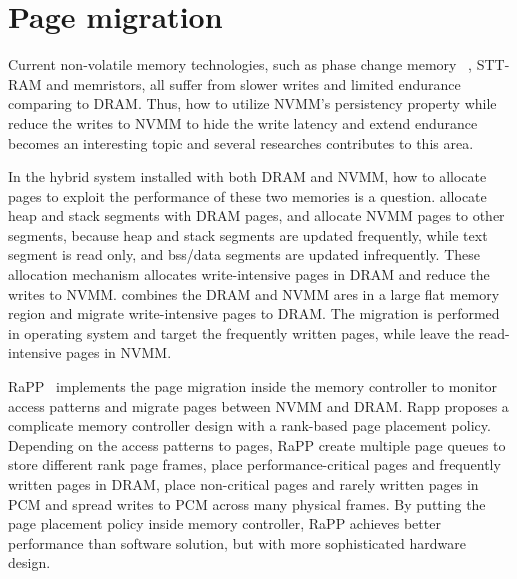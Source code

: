 \section{Page migration} 
\label{sec:migration}

Current non-volatile memory technologies, such as phase change memory
~\cite{PCMHierarchy}, STT-RAM and memristors, all suffer from slower writes and
limited endurance comparing to DRAM.
Thus, how to utilize NVMM's persistency property while reduce the writes to
NVMM to hide the write latency and extend endurance becomes an interesting
topic and several researches contributes to this area.

In the hybrid system installed with both DRAM and NVMM, how to allocate
pages to exploit the performance of these two memories is a question.
\cite{pcmalloc} allocate heap and stack segments with DRAM pages, and allocate
NVMM pages to other segments, because heap and stack segments are updated
frequently, while text segment is read only, and bss/data segments are
updated infrequently. These allocation mechanism allocates write-intensive
pages in DRAM and reduce the writes to NVMM. \cite{pcm3d} combines the DRAM
and NVMM ares in a large flat memory region and migrate write-intensive pages
to DRAM. The migration is performed in operating system and target the
frequently written pages, while leave the read-intensive pages in NVMM.

RaPP~\cite{RaPP} implements the page migration inside the memory controller
to monitor access patterns and migrate pages between NVMM and DRAM. Rapp
proposes a complicate memory controller design with a rank-based page
placement policy. Depending on the access patterns to pages, RaPP create
multiple page queues to store different rank page frames, place
performance-critical pages and frequently written pages in DRAM, place
non-critical pages and rarely written pages in PCM and spread writes
to PCM across many physical frames. By putting the page placement policy
inside memory controller, RaPP achieves better performance than software
solution, but with more sophisticated hardware design.

